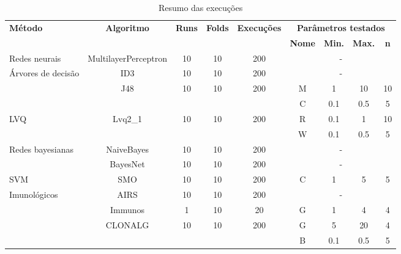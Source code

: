 \vspace{0.5cm}
\begin{table}[h]
    \scriptsize
    \centering
    \caption{Resumo das execuções}
    \label{tbl:dev_exec_summary}
    \vspace{0.5cm}
    \begin{tabular}{|l|c|c|c|c|c|c|c|c|}
        \hline
        \multirow{2}{*}{\textbf{Método}} & \multirow{2}{*}{\textbf{Algoritmo}} & \multirow{2}{*}{\textbf{Runs}} & \multirow{2}{*}{\textbf{Folds}} & \multirow{2}{*}{\textbf{Execuções}} & \multicolumn{4}{c|}{\textbf{Parâmetros testados}} \\
        \cline{6-9}
        & & & & & \textbf{Nome} & \textbf{Min.} & \textbf{Max.} & \textbf{n} \\
        \hline
        Redes neurais & MultilayerPerceptron & 10 & 10 & 200 & \multicolumn{4}{c|}{-} \\
        \hline
        \multirow{3}{*}{Árvores de decisão} & ID3 & 10 & 10 & 200 & \multicolumn{4}{c|}{-} \\
        \cline{2-9}
        & \multirow{2}{*}{J48} & \multirow{2}{*}{10} & \multirow{2}{*}{10} & \multirow{2}{*}{200} & M & 1 & 10 & 10 \\
        \cline{6-9}
        & & & & & C & 0.1 & 0.5 & 5 \\
        \hline
        \multirow{2}{*}{LVQ} & \multirow{2}{*}{Lvq2\_1} & \multirow{2}{*}{10} & \multirow{2}{*}{10} & \multirow{2}{*}{200} & R & 0.1 & 1 & 10 \\
        \cline{6-9}
        & & & & & W & 0.1 & 0.5 & 5 \\
        \hline
        \multirow{2}{*}{Redes bayesianas} & NaiveBayes & 10 & 10 & 200 & \multicolumn{4}{c|}{-} \\
        \cline{2-9}
        & BayesNet & 10 & 10 & 200 & \multicolumn{4}{c|}{-} \\
        \hline
        SVM & SMO & 10 & 10 & 200 & C & 1 & 5 & 5 \\
        \hline
        \multirow{4}{*}{Imunológicos} & AIRS & 10 & 10 & 200 & \multicolumn{4}{c|}{-} \\
        \cline{2-9}
        & Immunos & 1 & 10 & 20 & G & 1 & 4 & 4 \\
        \cline{2-9}
        & \multirow{2}{*}{CLONALG} & \multirow{2}{*}{10} & \multirow{2}{*}{10} & \multirow{2}{*}{200} & G & 5 & 20 & 4 \\
        \cline{6-9}
        & & & & & B & 0.1 & 0.5 & 5 \\
        \hline
    \end{tabular}
\end{table}
\vspace{0.5cm}

